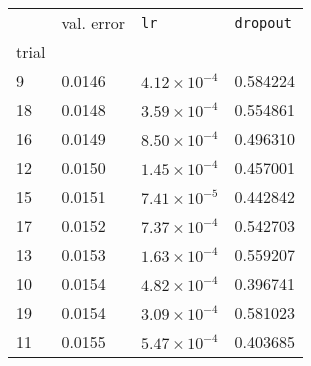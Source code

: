 \begin{tabular}{lp{2cm}p{2cm}p{2cm}}
\toprule
{} &  val. error &         \texttt{lr} &  \texttt{dropout} \\
trial &             &                     &                   \\
\midrule
9     &      0.0146 & $4.12\times10^{-4}$ &          0.584224 \\
18    &      0.0148 & $3.59\times10^{-4}$ &          0.554861 \\
16    &      0.0149 & $8.50\times10^{-4}$ &          0.496310 \\
12    &      0.0150 & $1.45\times10^{-4}$ &          0.457001 \\
15    &      0.0151 & $7.41\times10^{-5}$ &          0.442842 \\
17    &      0.0152 & $7.37\times10^{-4}$ &          0.542703 \\
13    &      0.0153 & $1.63\times10^{-4}$ &          0.559207 \\
10    &      0.0154 & $4.82\times10^{-4}$ &          0.396741 \\
19    &      0.0154 & $3.09\times10^{-4}$ &          0.581023 \\
11    &      0.0155 & $5.47\times10^{-4}$ &          0.403685 \\
\bottomrule
\end{tabular}
